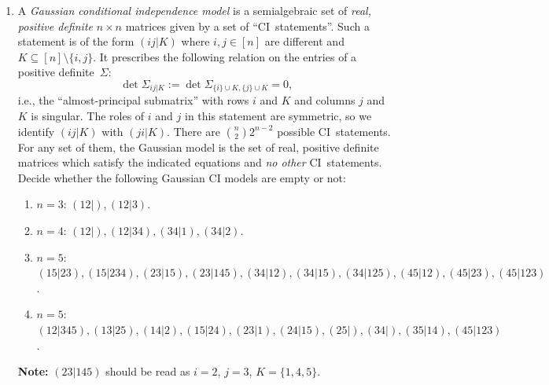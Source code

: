 \documentclass[11pt,reqno]{amsart}
\theoremstyle{definition}
\theoremstyle{remark}
\numberwithin{equation}{section}
\begin{document}
\begin{enumerate}
\item A \emph{Gaussian conditional independence model} is a semialgebraic
set of \emph{real, positive definite} $n \times n$ matrices given by a set
of ``CI~statements''. Such a statement is of the form $(ij|K)$ where
$i, j \in [n]$ are different and $K \subseteq [n] \setminus \{i,j\}$.
It prescribes the following relation on the entries of a positive
definite~$\Sigma$:
\[
  \det \Sigma_{ij|K} := \det \Sigma_{\{i\} \cup K, \{j\} \cup K} = 0,
\]
i.e., the ``almost-principal submatrix'' with rows $i$ and $K$ and columns
$j$ and $K$ is singular. The roles of $i$ and $j$ in this statement are
symmetric, so we identify $(ij|K)$ with $(ji|K)$. There are $\binom{n}{2} 2^{n-2}$
possible CI~statements. For any set of them, the Gaussian model is the set
of real, positive definite matrices which satisfy the indicated equations
and \emph{no other} CI~statements. Decide whether the following Gaussian
CI models are empty or not:

\begin{enumerate}
\scriptsize
\item $n=3$: $(12|), (12|3)$.
\item $n=4$: $(12|), (12|34), (34|1), (34|2)$.
\item $n=5$: $(15|23), (15|234), (23|15), (23|145), (34|12), (34|15), (34|125), (45|12), (45|23), (45|123)$.
\item $n=5$: $(12|345), (13|25), (14|2), (15|24), (23|1), (24|15), (25|), (34|), (35|14), (45|123)$.
\end{enumerate}

\textbf{Note:} $(23|145)$ should be read as $i=2$, $j=3$, $K = \{1,4,5\}$.

\end{enumerate}
\end{document}
